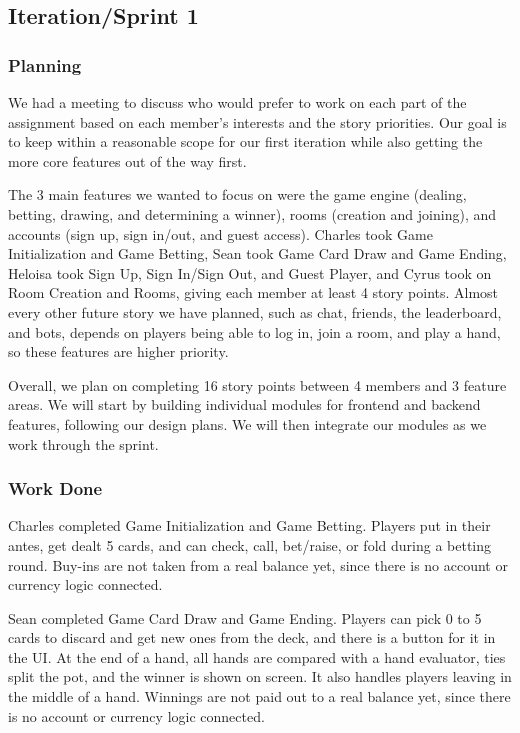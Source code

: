 \documentclass{article}
\begin{document}
\subsection{Iteration/Sprint 1}
\subsubsection{Planning}
We had a meeting to discuss who would prefer to work on each part of the assignment based on each member's interests and the story priorities. Our goal is to keep within a reasonable scope for our first iteration while also getting the more core features out of the way first. 

The 3 main features we wanted to focus on were the game engine (dealing, betting, drawing, and determining a winner), rooms (creation and joining), and accounts (sign up, sign in/out, and guest access). Charles took Game Initialization and Game Betting, Sean took Game Card Draw and Game Ending, Heloisa took Sign Up, Sign In/Sign Out, and Guest Player, and Cyrus took on Room Creation and Rooms, giving each member at least 4 story points. Almost every other future story we have planned, such as chat, friends, the leaderboard, and bots, depends on players being able to log in, join a room, and play a hand, so these features are higher priority.

Overall, we plan on completing 16 story points between 4 members and 3 feature areas. We will start by building individual modules for frontend and backend features, following our design plans. We will then integrate our modules as we work through the sprint.

\subsubsection{Work Done}
Charles completed Game Initialization and Game Betting. Players put in their antes, get dealt 5 cards, and can check, call, bet/raise, or fold during a betting round. Buy-ins are not taken from a real balance yet, since there is no account or currency logic connected.

Sean completed Game Card Draw and Game Ending. Players can pick 0 to 5 cards to discard and get new ones from the deck, and there is a button for it in the UI. At the end of a hand, all hands are compared with a hand evaluator, ties split the pot, and the winner is shown on screen. It also handles players leaving in the middle of a hand. Winnings are not paid out to a real balance yet, since there is no account or currency logic connected.
\end{document}
